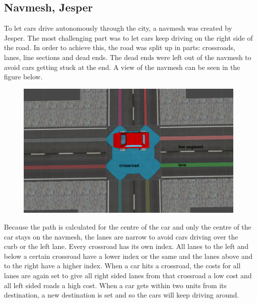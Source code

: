 \documentclass{article}
\begin{document}
	\newpage

\subsection{Navmesh, Jesper}
	To let cars drive autonomously through the city, a navmesh was created by Jesper. The most challenging part was to let cars keep driving on the right side of the road. In order to achieve this, the road was split up in parts: crossroads, lanes, line sections and dead ends. The dead ends were left out of the navmesh to avoid cars getting stuck at the end. A view of the navmesh can be seen in the figure below.

	\begin{figure}[ht!]
		\centering
		\includegraphics[width=120mm]{images/Navmesh.png}
	\end{figure}

	Because the path is calculated for the centre of the car and only the centre of the car stays on the navmesh, the lanes are narrow to avoid cars driving over the curb or the left lane. Every crossroad has its own index. All lanes to the left and below a certain crossroad have a lower index or the same and the lanes above and to the right have a higher index. When a car hits a crossroad, the costs for all lanes are again set to give all right sided lanes from that crossroad a low cost and all left sided roads a high cost. When a car gets within two units from its destination, a new destination is set and so the cars will keep driving around.
\end{document}
